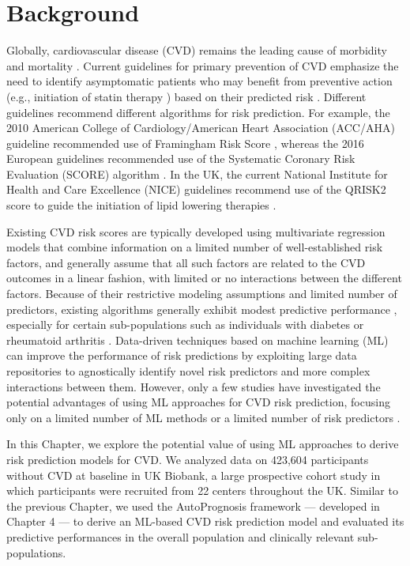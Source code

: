 \documentclass [PhD] {uclathes}
\begin{document}
\section{Background}
\label{ch7sec0}
Globally, cardiovascular disease (CVD) remains the leading cause of morbidity and mortality \cite{thomas2017novel}. Current guidelines for primary prevention of CVD emphasize the need to identify asymptomatic patients who may benefit from preventive action (e.g., initiation of statin therapy \cite{ridker2008rosuvastatin}) based on their predicted risk \cite{kremers2008high,d2008general,conroy2003estimation,sjostrom2004lifestyle}. Different guidelines recommend different algorithms for risk prediction. For example, the 2010 American College of Cardiology/American Heart Association (ACC/AHA) guideline \cite{greenland20102010} recommended use of Framingham Risk Score \cite{d2008general}, whereas the 2016 European guidelines recommended use of the Systematic Coronary Risk Evaluation (SCORE) algorithm \cite{piepoli20162016}. In the UK, the current National Institute for Health and Care Excellence (NICE) guidelines recommend use of the QRISK2 score to guide the initiation of lipid lowering therapies \cite{hippisley2008predicting,hippisley2017development}. 

Existing CVD risk scores are typically developed using multivariate regression models that combine information on a limited number of well-established risk factors, and generally assume that all such factors are related to the CVD outcomes in a linear fashion, with limited or no interactions between the different factors. Because of their restrictive modeling assumptions and limited number of predictors, existing algorithms generally exhibit modest predictive performance \cite{siontis2012comparisons}, especially for certain sub-populations such as individuals with diabetes \cite{coleman2007framingham,mcewan2004evaluating,martin2014type,buse2007primary} or rheumatoid arthritis \cite{kremers2008high}. Data-driven techniques based on machine learning (ML) can improve the performance of risk predictions by exploiting large data repositories to agnostically identify novel risk predictors and more complex interactions between them. However, only a few studies have investigated the potential advantages of using ML approaches for CVD risk prediction, focusing only on a limited number of ML methods \cite{ambale2017cardiovascular,ahmad2018machine} or a limited number of risk predictors \cite{weng2017can}.   

In this Chapter, we explore the potential value of using ML approaches to derive risk prediction models for CVD. We analyzed data on 423,604 participants without CVD at baseline in UK Biobank, a large prospective cohort study in which participants were recruited from 22 centers throughout the UK. Similar to the previous Chapter, we used the AutoPrognosis framework --- developed in Chapter 4 --- to derive an ML-based CVD risk prediction model and evaluated its predictive performances in the overall population and clinically relevant sub-populations. 
\end{document}
